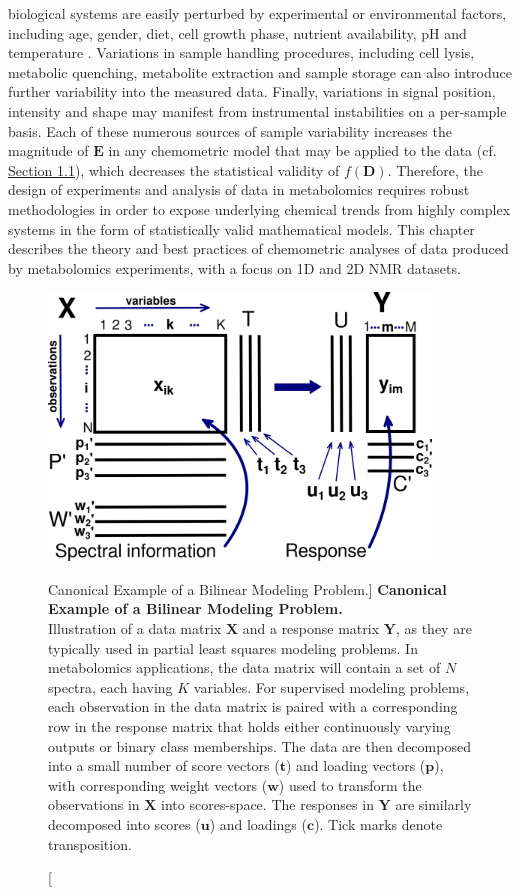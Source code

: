 \begin{doublespace}
biological systems are easily perturbed by experimental or environmental
factors, including age, gender, diet, cell growth phase, nutrient availability,
pH and temperature \cite{tyagi:ijpsrr2010,zhang:jiomic2013}. Variations in
sample handling procedures, including cell lysis, metabolic quenching,
metabolite extraction and sample storage can also introduce further variability
into the measured data. Finally, variations in signal position, intensity and
shape may manifest from instrumental instabilities on a per-sample basis.
Each of these numerous sources of sample variability increases the magnitude of
$\mathbf{E}$ in any chemometric model that may be applied to the data
(cf. \hyperlink{section.1.1}{Section 1.1}), which decreases the statistical
validity of $f(\mathbf{D})$. Therefore, the design of experiments and analysis
of data in metabolomics requires robust methodologies in order to expose
underlying chemical trends from highly complex systems in the form of
statistically valid mathematical models. This chapter describes the theory
and best practices of chemometric analyses of data produced by metabolomics
experiments, with a focus on 1D \hnmr{} and 2D \hcnmr{} NMR datasets.
\end{doublespace}

\begin{figure}[ht!]
\begin{center}
  \includegraphics[width=4in]{figs/mva/01.png}
\end{center}
\caption
      [Canonical Example of a Bilinear Modeling Problem.]{
  {\bf Canonical Example of a Bilinear Modeling Problem.}
  \\
  Illustration of a data matrix $\mathbf{X}$ and a response matrix
  $\mathbf{Y}$, as they are typically used in partial least squares
  modeling problems. In metabolomics applications, the data matrix will
  contain a set of $N$ spectra, each having $K$ variables. For supervised
  modeling problems, each observation in the data matrix is paired with a
  corresponding row in the response matrix that holds either continuously
  varying outputs or binary class memberships. The data are then decomposed
  into a small number of score vectors ($\mathbf{t}$) and loading vectors
  ($\mathbf{p}$), with corresponding weight vectors ($\mathbf{w}$) used
  to transform the observations in $\mathbf{X}$ into scores-space. The
  responses in $\mathbf{Y}$ are similarly decomposed into scores
  ($\mathbf{u}$) and loadings ($\mathbf{c}$). Tick marks denote
  transposition.
}
\end{figure}

